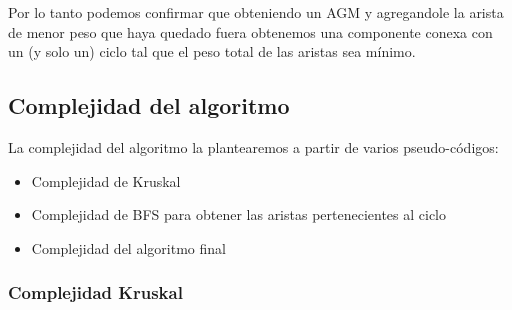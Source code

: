 Por lo tanto podemos confirmar que obteniendo un AGM y agregandole la arista de menor peso que haya quedado fuera obtenemos una componente conexa con un (y solo un) ciclo tal que el peso total de las aristas sea m\'inimo.


\newpage


\subsection{Complejidad del algoritmo}

La complejidad del algoritmo la plantearemos a partir de varios pseudo-códigos:

\begin{itemize}
\item Complejidad de Kruskal
\item Complejidad de BFS para obtener las aristas pertenecientes al ciclo
\item Complejidad del algoritmo final
\end{itemize}

\subsubsection{Complejidad Kruskal}


